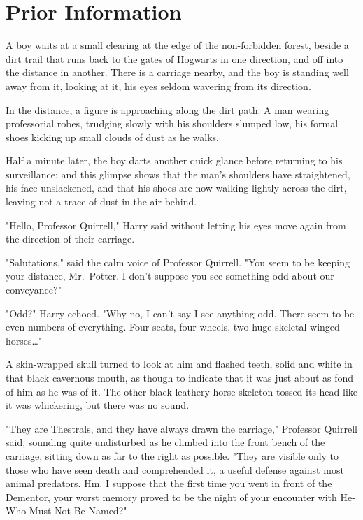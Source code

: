 \chapter{Prior Information}

\lettrine{A}{} boy waits at a 
small clearing at the edge of the non-forbidden forest, beside a dirt trail 
that runs back to the gates of Hogwarts in one direction, and off into the 
distance in another. There is a carriage nearby, and the boy is standing well 
away from it, looking at it, his eyes seldom wavering from its direction.

In the distance, a figure is approaching along the dirt path: A man wearing 
professorial robes, trudging slowly with his shoulders slumped low, his formal 
shoes kicking up small clouds of dust as he walks.

Half a minute later, the boy darts another quick glance before returning to his 
surveillance; and this glimpse shows that the man's shoulders have 
straightened, his face unslackened, and that his shoes are now walking lightly 
across the dirt, leaving not a trace of dust in the air behind.

"Hello, Professor Quirrell," Harry said without letting his eyes move again 
from the direction of their carriage.

"Salutations," said the calm voice of Professor Quirrell. "You seem to be 
keeping your distance, Mr.~Potter. I don't suppose you see something odd about 
our conveyance?"

"Odd?" Harry echoed. "Why no, I can't say I see anything odd. There seem to be 
even numbers of everything. Four seats, four wheels, two huge skeletal winged 
horses{\ldots}"

A skin-wrapped skull turned to look at him and flashed teeth, solid and white 
in that black cavernous mouth, as though to indicate that it was just about as 
fond of him as he was of it. The other black leathery horse-skeleton tossed its 
head like it was whickering, but there was no sound.

"They are Thestrals, and they have always drawn the carriage," Professor 
Quirrell said, sounding quite undisturbed as he climbed into the front bench of 
the carriage, sitting down as far to the right as possible. "They are visible 
only to those who have seen death and comprehended it, a useful defense against 
most animal predators. Hm. I suppose that the first time you went in front of 
the Dementor, your worst memory proved to be the night of your encounter with 
He-Who-Must-Not-Be-Named?"

